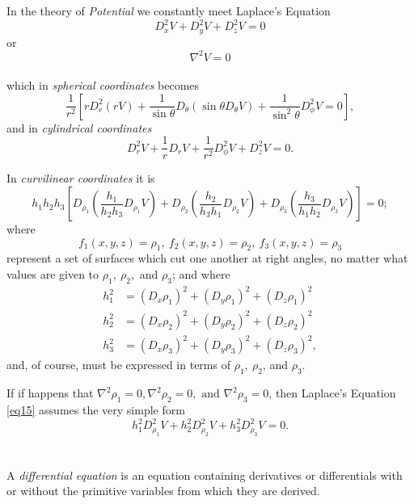 \documentclass[oneside,12pt]{book}
\begin{document}
In the theory of \textit{Potential} we constantly meet Laplace's Equation 
\begin{equation}
    \label{eq12}
    D_x^2V+D_y^2V+D_z^2V=0
\end{equation}
or $$\nabla^2V=0$$ \\ 
which in \textit{spherical coordinates} becomes 
\begin{equation}
    \label{eq13}
    \frac{1}{r^2}\left[rD_r^2(rV)+\frac{1}{\sin\theta}D_\theta(\sin\theta D_\theta V)+\frac{1}{\sin^2\theta}D_\phi^2V=0\right],
\end{equation}
and in \textit{cylindrical coordinates}
\begin{equation}
    \label{eq14}
    D_r^2V+\frac{1}{r}D_rV+\frac{1}{r^2}D_\phi^2V+D_z^2V=0.
\end{equation} \par 

In \textit{curvilinear coordinates} it is 
\begin{equation}
    \label{eq15}
    h_1h_2h_3\left[D_{\rho_1}\left(\frac{h_1}{h_2h_3}D_{\rho_1}V\right)+D_{\rho_2}\left(\frac{h_2}{h_3h_1}D_{\rho_2}V\right)+D_{\rho_3}\left(\frac{h_3}{h_1h_2}D_{\rho_3}V\right)\right]=0;
\end{equation}
where $$f_1(x,y,z)=\rho_1,\ f_2(x,y,z)=\rho_2,\ f_3(x,y,z)=\rho_3$$ 
represent a set of surfaces which cut one another at right angles, no matter what values are given to $\rho_1,\ \rho_2,$ and $\rho_3$; and where 
\begin{align*}
    h_1^2&=(D_x\rho_1)^2+(D_y\rho_1)^2+(D_z\rho_1)^2 \\
    h_2^2&=(D_x\rho_2)^2+(D_y\rho_2)^2+(D_z\rho_2)^2 \\
    h_3^2&=(D_x\rho_3)^2+(D_y\rho_3)^2+(D_z\rho_3)^2,
\end{align*}
and, of course, must be expressed in terms of $\rho_1,\ \rho_2$, and $\rho_3$. \par 

If if happens that $\nabla^2\rho_1=0,\nabla^2\rho_2=0,\text{ and } \nabla^2\rho_3=0$, then Laplace's Equation \eqref{eq15} assumes the very simple form 
\begin{equation}
    h_1^2D_{\rho_1}^2V+h_2^2D_{\rho_2}^2V+h_3^2D_{\rho_3}^2V=0.
\end{equation} \par 

\section{} A \textit{differential equation} is an equation containing derivatives or differentials with or without the primitive variables from which they are derived. \par 
\end{document}
